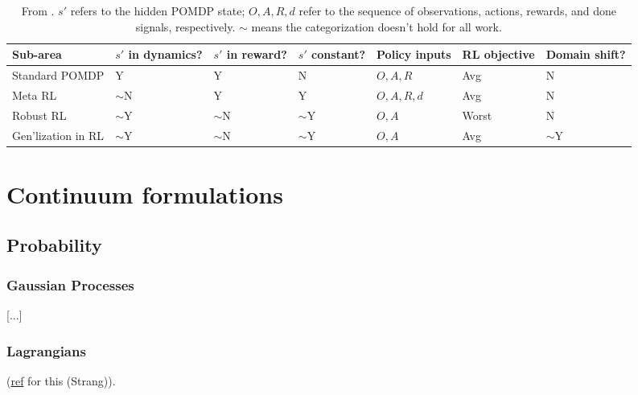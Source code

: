 \documentclass[notitlepage,openany,11pt]{report}
\theoremstyle{plain}%
\numberwithin{equation}{section}
\begin{document}
\begin{table}[h!]
\centering
\begin{tabularx}{0.95\textwidth} { 
>{\raggedright\arraybackslash}X >{\raggedright\arraybackslash}X >{\raggedright\arraybackslash}X >{\raggedright\arraybackslash}X >{\raggedright\arraybackslash}X >{\raggedright\arraybackslash}X >{\raggedright\arraybackslash}X
}
\hline\hline
Sub-area & $s'$ in dynamics? & $s'$ in reward? & $s'$ constant? & Policy inputs & RL objective & Domain shift? \\
\hline\hline
Standard POMDP & Y & Y & N & $O, A, R$ & Avg & N \\ 
\hline
Meta RL & $\sim$N & Y & Y & $O, A, R, d$ & Avg & N \\ 
\hline
Robust RL & $\sim$Y & $\sim$N & $\sim$Y & $O, A$ & Worst & N \\ 
\hline
Gen'lization in RL & $\sim$Y & $\sim$N & $\sim$Y & $O, A$ & Avg &  $\sim$Y \\ 
\hline\hline
\end{tabularx}
\caption{From \cite{NiEtAl:21}. $s'$ refers to the hidden POMDP state; $O, A, R, d$ refer to the sequence of observations, actions, rewards, and done signals, respectively. $\sim$ means the categorization doesn't hold for all work.
}
\end{table}




\chapter{Continuum formulations}

\section{Probability}


\subsection{Gaussian Processes}

[...]


\subsection{Lagrangians}
(\href{http://math.mit.edu/classes/18.086/2006/am72.pdf}{ref} for this (Strang)). 
\end{document}

